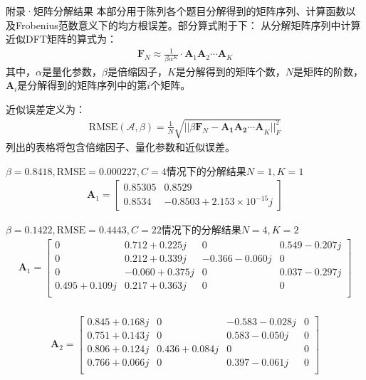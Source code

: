 \documentclass[11pt]{article}
\begin{document}
\begin{section}{附录·矩阵分解结果}
 本部分用于陈列各个题目分解得到的矩阵序列、计算函数以及Frobenius范数意义下的均方根误差。部分算式附于下：
 从分解矩阵序列中计算近似DFT矩阵的算式为：
 \begin{align*}
   \mathbf{F}_N\approx\frac{1}{\beta\alpha^K}\cdot\mathbf{A}_1\mathbf{A}_2\cdots\mathbf{A}_K
 \end{align*}
 其中，$\alpha$是量化参数，$\beta$是倍缩因子，$K$是分解得到的矩阵个数，$N$是矩阵的阶数，$\mathbf{A}_i$是分解得到的矩阵序列中的第$i$个矩阵。\par
 近似误差定义为：
 \begin{align*}
   \mathrm{RMSE}(\mathcal{A},\beta)=\frac{1}{N}\sqrt{||\beta\mathbf{F}_N-\mathbf{A_1A_2\cdots A}_K||_F^2}
 \end{align*}
 列出的表格将包含倍缩因子、量化参数和近似误差。
 \begin{center}
   $\beta=0.8418,\mathrm{RMSE}=0.000227,C=4$情况下的分解结果$N=1,K=1$
   \begin{align*}
     \mathbf{A}_1=
     \left[
       \begin{matrix}
         0.85305 & 0.8529                        \\
         0.8534  & -0.8503+2.153\times 10^{-15}j
       \end{matrix}
       \right]
   \end{align*}
 \end{center}

 \begin{center}
   $\beta=0.1422,\mathrm{RMSE}=0.4443,C=22$情况下的分解结果$N=4,K=2$
   \begin{align*}
     \mathbf{A}_1=\left[
       \begin{matrix}
         0            & 0.712+0.225j  & 0             & 0.549-0.207j \\
         0            & 0.212+0.339j  & -0.366-0.060j & 0            \\
         0            & -0.060+0.375j & 0             & 0.037-0.297j \\
         0.495+0.109j & 0.217+0.363j  & 0             & 0            \\
       \end{matrix}
       \right]
   \end{align*}\\
   \begin{align*}
     \mathbf{A}_2=\left[
       \begin{matrix}
         0.845+0.168j & 0            & -0.583-0.028j & 0 \\
         0.751+0.143j & 0            & 0.583-0.050j  & 0 \\
         0.806+0.124j & 0.436+0.084j & 0             & 0 \\
         0.766+0.066j & 0            & 0.397-0.061j  & 0 \\
       \end{matrix}
       \right]
   \end{align*}
 \end{center}



\end{section}
\end{document}
